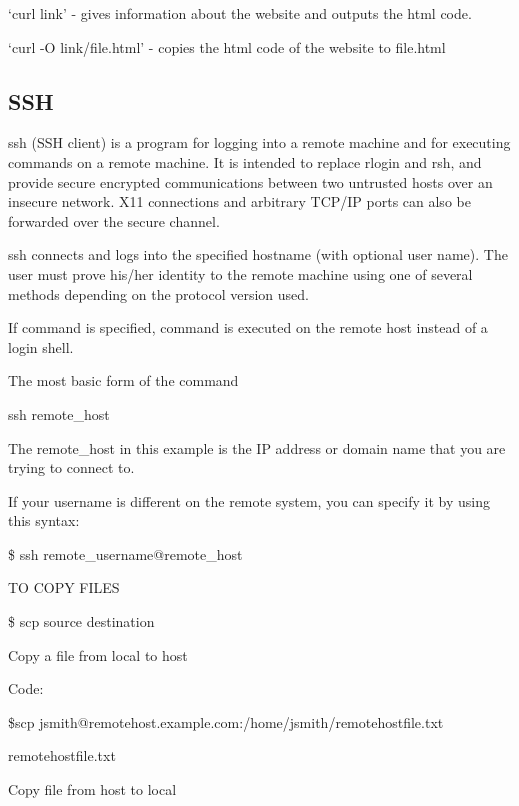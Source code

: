 \documentclass{article}
\begin{document}
`curl link' - gives information about the website and outputs the html code.

`curl -O link/file.html' - copies the html code of the website to file.html

\subsection{SSH}

     ssh (SSH client) is a program for logging into a remote machine and for
     executing commands on a remote machine.  It is intended to replace rlogin
     and rsh, and provide secure encrypted communications between two
     untrusted hosts over an insecure network.  X11 connections and arbitrary
     TCP/IP ports can also be forwarded over the secure channel.

     ssh connects and logs into the specified hostname (with optional user
     name).  The user must prove his/her identity to the remote machine using
     one of several methods depending on the protocol version used.

     If command is specified, command is executed on the remote host instead
     of a login shell.
    
The most basic form of the command 

\hspace{10mm}ssh remote\_host

\hspace{10mm}The remote\_host in this example is the IP address or domain name that you are trying to connect to.

\hspace{10mm}If your username is different on the remote system, you can specify it by using this syntax:

\hspace{10mm} \$ ssh remote\_username@remote\_host

TO COPY FILES

\hspace{10mm} \$ scp source destination

Copy a file from local to host

\hspace{10mm}Code:

\hspace{10mm}\$scp jsmith@remotehost.example.com:/home/jsmith/remotehostfile.txt

\hspace{10mm}remotehostfile.txt

Copy file from host to local
\end{document}
